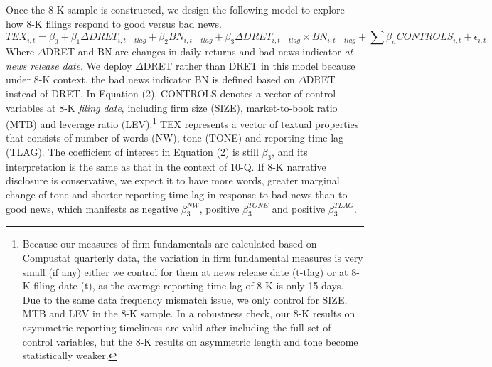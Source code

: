 \documentclass[letterpaper,11pt]{article}
\begin{document}
\begin{spacing}{1.5}
Once the 8-K sample is constructed, we design the following model to explore how 8-K filings respond to good versus bad news.
\begin{equation} \label{eq2}
TEX_{i,t}=\beta_0+\beta_1\Delta DRET_{i,t-tlag}+\beta_2BN_{i,t-tlag}+\beta_3\Delta DRET_{i,t-tlag}\times BN_{i,t-tlag}+\sum\beta_nCONTROLS_{i,t}+\epsilon_{i,t}
\end{equation}
Where $\Delta$DRET and BN are changes in daily returns and bad news indicator \textit{at news release date}. We deploy $\Delta$DRET rather than DRET in this model because under 8-K context, the bad news indicator BN is defined based on $\Delta$DRET instead of DRET. In Equation (2), CONTROLS denotes a vector of control variables at 8-K \textit{filing date}, including firm size (SIZE), market-to-book ratio (MTB) and leverage ratio (LEV).\footnote{Because our measures of firm fundamentals are calculated based on Compustat quarterly data, the variation in firm fundamental measures is very small (if any) either we control for them at news release date (t-tlag) or at 8-K filing date (t), as the average reporting time lag of 8-K is only 15 days. Due to the same data frequency mismatch issue, we only control for SIZE, MTB and LEV in the 8-K sample. In a robustness check, our 8-K results on asymmetric reporting timeliness are valid after including the full set of control variables, but the 8-K results on asymmetric length and tone become statistically weaker.} TEX represents a vector of textual properties that consists of number of words (NW), tone (TONE) and reporting time lag (TLAG). The coefficient of interest in Equation (2) is still $\beta_3$, and its interpretation is the same as that in the context of 10-Q. If 8-K narrative disclosure is conservative, we expect it to have more words, greater marginal change of tone and shorter reporting time lag in response to bad news than to good news, which manifests as negative $\beta_3^{NW}$, positive  $\beta_3^{TONE}$ and positive $\beta_3^{TLAG}$.


\end{spacing}
\end{document}
